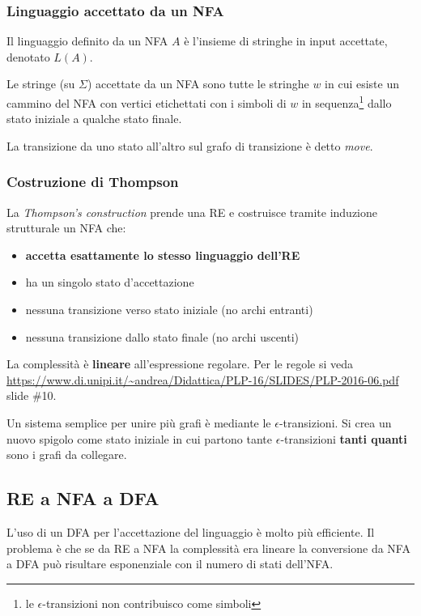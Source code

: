 \subsubsection{Linguaggio accettato da un NFA}
\begin{definition}
Il linguaggio definito da un NFA $A$ è l'insieme di stringhe in input accettate,
denotato $L(A)$.
\end{definition}

Le stringe (su $\Sigma$) accettate da un NFA sono tutte le stringhe $w$ in cui
esiste un cammino del NFA con vertici etichettati con i simboli di $w$ in
sequenza\footnote{le $\epsilon$-transizioni non contribuisco come simboli} dallo
stato iniziale a qualche stato finale.

La transizione da uno stato all'altro sul grafo di transizione è detto
\textit{move}.

\subsubsection{Costruzione di Thompson}
\label{sec:costruzione_thompson}
La \textit{Thompson's construction} prende una RE e costruisce tramite induzione
strutturale un NFA che:
\begin{itemize}
\item \textbf{accetta esattamente lo stesso linguaggio dell'RE}
\item ha un singolo stato d'accettazione
\item nessuna transizione verso stato iniziale (no archi entranti)
\item nessuna transizione dallo stato finale (no archi uscenti)
\end{itemize}

La complessità è \textbf{lineare} all'espressione regolare. Per le regole si
veda
\url{https://www.di.unipi.it/~andrea/Didattica/PLP-16/SLIDES/PLP-2016-06.pdf}
slide \#10.

Un sistema semplice per unire più grafi è mediante le $\epsilon$-transizioni.
Si crea un nuovo spigolo come stato iniziale in cui partono tante
$\epsilon$-transizioni \textbf{tanti quanti} sono i grafi da collegare.

\subsection{RE a NFA a DFA}
L'uso di un DFA per l'accettazione del linguaggio è molto più efficiente. Il
problema è che se da RE a NFA la complessità era lineare la conversione da NFA
a DFA può risultare esponenziale con il numero di stati dell'NFA.

